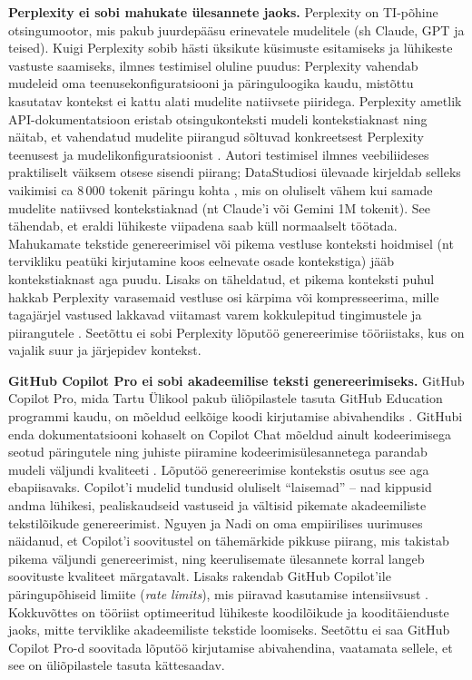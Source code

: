 \textbf{Perplexity ei sobi mahukate ülesannete jaoks.} Perplexity on TI-põhine otsingumootor, mis pakub juurdepääsu erinevatele mudelitele (sh Claude, GPT ja teised). Kuigi Perplexity sobib hästi üksikute küsimuste esitamiseks ja lühikeste vastuste saamiseks, ilmnes testimisel oluline puudus: Perplexity vahendab mudeleid oma teenusekonfiguratsiooni ja päringuloogika kaudu, mistõttu kasutatav kontekst ei kattu alati mudelite natiivsete piiridega. Perplexity ametlik API-dokumentatsioon eristab otsingukonteksti mudeli kontekstiaknast ning näitab, et vahendatud mudelite piirangud sõltuvad konkreetsest Perplexity teenusest ja mudelikonfiguratsioonist \cite{perplexity2026pricing, perplexity2026models}. Autori testimisel ilmnes veebiliideses praktiliselt väiksem otsese sisendi piirang; DataStudiosi ülevaade kirjeldab selleks vaikimisi ca 8\,000 tokenit päringu kohta \cite{datastudios2025perplexity}, mis on oluliselt vähem kui samade mudelite natiivsed kontekstiaknad (nt Claude'i või Gemini 1M tokenit). See tähendab, et eraldi lühikeste viipadena saab küll normaalselt töötada. Mahukamate tekstide genereerimisel või pikema vestluse konteksti hoidmisel (nt tervikliku peatüki kirjutamine koos eelnevate osade kontekstiga) jääb kontekstiaknast aga puudu. Lisaks on täheldatud, et pikema konteksti puhul hakkab Perplexity varasemaid vestluse osi kärpima või kompresseerima, mille tagajärjel vastused lakkavad viitamast varem kokkulepitud tingimustele ja piirangutele \cite{datastudios2025perplexity}. Seetõttu ei sobi Perplexity lõputöö genereerimise tööriistaks, kus on vajalik suur ja järjepidev kontekst.

\textbf{GitHub Copilot Pro ei sobi akadeemilise teksti genereerimiseks.} GitHub Copilot Pro, mida Tartu Ülikool pakub üliõpilastele tasuta GitHub Education programmi kaudu, on mõeldud eelkõige koodi kirjutamise abivahendiks \cite{github2026copilot}. GitHubi enda dokumentatsiooni kohaselt on Copilot Chat mõeldud ainult kodeerimisega seotud päringutele ning juhiste piiramine kodeerimisülesannetega parandab mudeli väljundi kvaliteeti \cite{github2026copilot_responsible}. Lõputöö genereerimise kontekstis osutus see aga ebapiisavaks. Copilot'i mudelid tundusid oluliselt ``laisemad'' -- nad kippusid andma lühikesi, pealiskaudseid vastuseid ja vältisid pikemate akadeemiliste tekstilõikude genereerimist. Nguyen ja Nadi \cite{nguyen2022empirical} on oma empiirilises uurimuses näidanud, et Copilot'i soovitustel on tähemärkide pikkuse piirang, mis takistab pikema väljundi genereerimist, ning keerulisemate ülesannete korral langeb soovituste kvaliteet märgatavalt. Lisaks rakendab GitHub Copilot'ile päringupõhiseid limiite (\textit{rate limits}), mis piiravad kasutamise intensiivsust \cite{github2026copilot_ratelimits}. Kokkuvõttes on tööriist optimeeritud lühikeste koodilõikude ja kooditäienduste jaoks, mitte terviklike akadeemiliste tekstide loomiseks. Seetõttu ei saa GitHub Copilot Pro-d soovitada lõputöö kirjutamise abivahendina, vaatamata sellele, et see on üliõpilastele tasuta kättesaadav.


